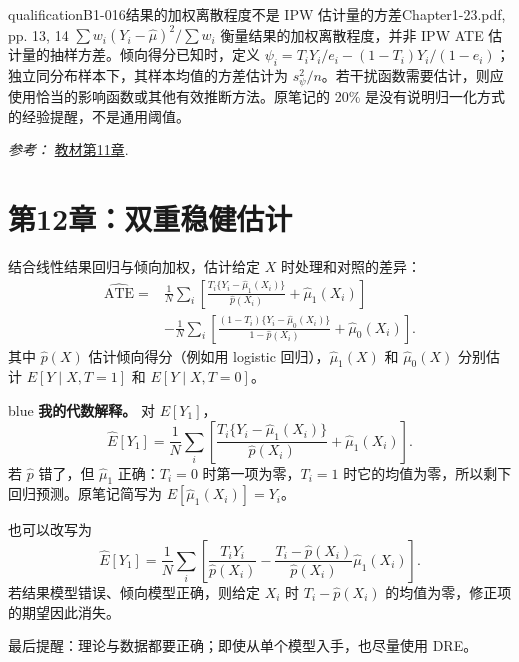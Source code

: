 {\begin{reviewnote}{qualification}{B1-016}{结果的加权离散程度不是 IPW 估计量的方差}{Chapter1-23.pdf, pp. 13, 14}
$\sum w_i(Y_i-\hat\mu)^2/\sum w_i$ 衡量结果的加权离散程度，并非 IPW ATE 估计量的抽样方差。倾向得分已知时，定义 $\psi_i=T_iY_i/e_i-(1-T_i)Y_i/(1-e_i)$；独立同分布样本下，其样本均值的方差估计为 $s_\psi^2/n$。若干扰函数需要估计，则应使用恰当的影响函数或其他有效推断方法。原笔记的 20\% 是没有说明归一化方式的经验提醒，不是通用阈值。
\par\smallskip\textit{参考：} \href{https://matheusfacure.github.io/python-causality-handbook/11-Propensity-Score.html}{教材第11章}.
\end{reviewnote}
\section{第12章：双重稳健估计}
结合线性结果回归与倾向加权，估计给定 $X$ 时处理和对照的差异：
\begin{align*}
\widehat{\mathrm{ATE}}={}&\frac1N\sum_i\left[\frac{T_i\{Y_i-\hat\mu_1(X_i)\}}{\hat p(X_i)}+\hat\mu_1(X_i)\right]\\
&-\frac1N\sum_i\left[\frac{(1-T_i)\{Y_i-\hat\mu_0(X_i)\}}{1-\hat p(X_i)}+\hat\mu_0(X_i)\right].
\end{align*}
其中 $\hat p(X)$ 估计倾向得分（例如用 logistic 回归），$\hat\mu_1(X)$ 和 $\hat\mu_0(X)$ 分别估计 $E[Y\mid X,T=1]$ 和 $E[Y\mid X,T=0]$。

\begin{inkblock}{blue}
\textbf{我的代数解释。} 对 $E[Y_1]$，
\[\widehat E[Y_1]=\frac1N\sum_i\left[\frac{T_i\{Y_i-\hat\mu_1(X_i)\}}{\hat p(X_i)}+\hat\mu_1(X_i)\right].\]
若 $\hat p$ 错了，但 $\hat\mu_1$ 正确：$T_i=0$ 时第一项为零，$T_i=1$ 时它的均值为零，所以剩下回归预测。原笔记简写为 $E[\hat\mu_1(X_i)]=Y_i$。

也可以改写为
\[\widehat E[Y_1]=\frac1N\sum_i\left[\frac{T_iY_i}{\hat p(X_i)}-\frac{T_i-\hat p(X_i)}{\hat p(X_i)}\hat\mu_1(X_i)\right].\]
若结果模型错误、倾向模型正确，则给定 $X_i$ 时 $T_i-\hat p(X_i)$ 的均值为零，修正项的期望因此消失。\end{inkblock}
最后提醒：理论与数据都要正确；即使从单个模型入手，也尽量使用 DRE。

}

